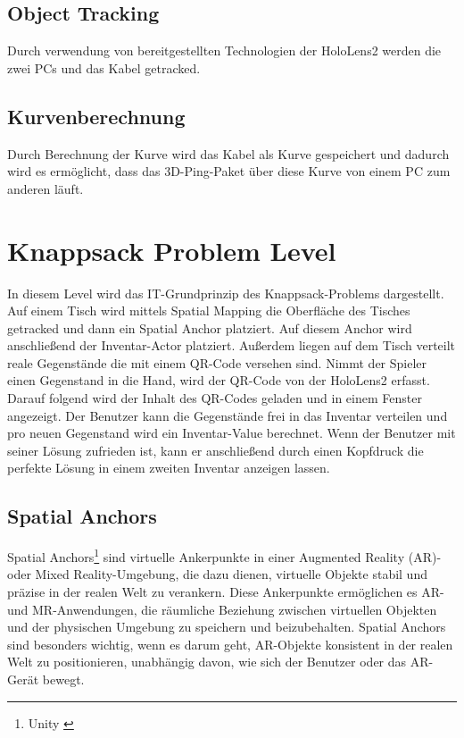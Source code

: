 \subsection{Object Tracking}
Durch verwendung von bereitgestellten Technologien der HoloLens2
werden die zwei PCs und das Kabel getracked.

\subsection{Kurvenberechnung}
Durch Berechnung der Kurve wird das Kabel als Kurve gespeichert
und dadurch wird es ermöglicht, dass das 3D-Ping-Paket über diese
Kurve von einem PC zum anderen läuft.

\section{Knappsack Problem Level}
In diesem Level wird das IT-Grundprinzip des Knappsack-Problems dargestellt.
Auf einem Tisch wird mittels Spatial Mapping die Oberfläche des Tisches
getracked und dann ein Spatial Anchor platziert. Auf diesem Anchor wird
anschließend der Inventar-Actor platziert. Außerdem liegen auf dem Tisch
verteilt reale Gegenstände die mit einem QR-Code versehen sind. Nimmt der
Spieler einen Gegenstand in die Hand, wird der QR-Code von der HoloLens2
erfasst. Darauf folgend wird der Inhalt des QR-Codes geladen und in einem
Fenster angezeigt. Der Benutzer kann die Gegenstände frei in das Inventar
verteilen und pro neuen Gegenstand wird ein Inventar-Value berechnet.
Wenn der Benutzer mit seiner Lösung zufrieden ist, kann er anschließend
durch einen Kopfdruck die perfekte Lösung in einem zweiten Inventar anzeigen
lassen.

\subsection{Spatial Anchors}
Spatial Anchors\footnote{Unity \cite{Anchor}} sind virtuelle Ankerpunkte in einer Augmented Reality (AR)- oder Mixed Reality-Umgebung, die dazu dienen,
virtuelle Objekte stabil und präzise in der realen Welt zu verankern. Diese Ankerpunkte ermöglichen es AR- und
MR-Anwendungen, die räumliche Beziehung zwischen virtuellen Objekten und der physischen Umgebung zu speichern und
beizubehalten. Spatial Anchors sind besonders wichtig, wenn es darum geht, AR-Objekte konsistent in der realen Welt
zu positionieren, unabhängig davon, wie sich der Benutzer oder das AR-Gerät bewegt.

